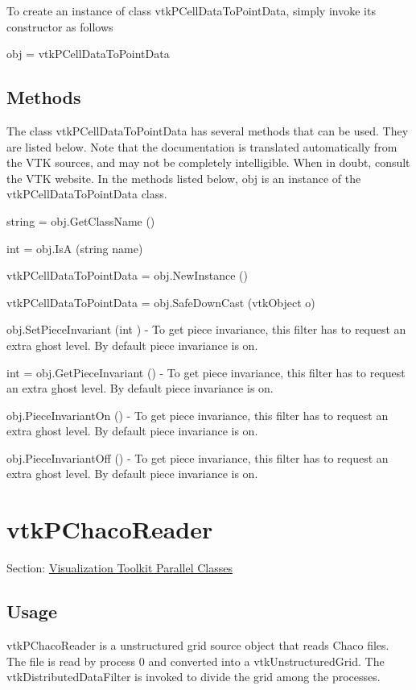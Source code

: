 To create an instance of class vtk\-P\-Cell\-Data\-To\-Point\-Data, simply invoke its constructor as follows \begin{DoxyVerb}  obj = vtkPCellDataToPointData
\end{DoxyVerb}
 \hypertarget{vtkwidgets_vtkxyplotwidget_Methods}{}\subsection{Methods}\label{vtkwidgets_vtkxyplotwidget_Methods}
The class vtk\-P\-Cell\-Data\-To\-Point\-Data has several methods that can be used. They are listed below. Note that the documentation is translated automatically from the V\-T\-K sources, and may not be completely intelligible. When in doubt, consult the V\-T\-K website. In the methods listed below, {\ttfamily obj} is an instance of the vtk\-P\-Cell\-Data\-To\-Point\-Data class. 
\begin{DoxyItemize}
\item {\ttfamily string = obj.\-Get\-Class\-Name ()}  
\item {\ttfamily int = obj.\-Is\-A (string name)}  
\item {\ttfamily vtk\-P\-Cell\-Data\-To\-Point\-Data = obj.\-New\-Instance ()}  
\item {\ttfamily vtk\-P\-Cell\-Data\-To\-Point\-Data = obj.\-Safe\-Down\-Cast (vtk\-Object o)}  
\item {\ttfamily obj.\-Set\-Piece\-Invariant (int )} -\/ To get piece invariance, this filter has to request an extra ghost level. By default piece invariance is on.  
\item {\ttfamily int = obj.\-Get\-Piece\-Invariant ()} -\/ To get piece invariance, this filter has to request an extra ghost level. By default piece invariance is on.  
\item {\ttfamily obj.\-Piece\-Invariant\-On ()} -\/ To get piece invariance, this filter has to request an extra ghost level. By default piece invariance is on.  
\item {\ttfamily obj.\-Piece\-Invariant\-Off ()} -\/ To get piece invariance, this filter has to request an extra ghost level. By default piece invariance is on.  
\end{DoxyItemize}\hypertarget{vtkparallel_vtkpchacoreader}{}\section{vtk\-P\-Chaco\-Reader}\label{vtkparallel_vtkpchacoreader}
Section\-: \hyperlink{sec_vtkparallel}{Visualization Toolkit Parallel Classes} \hypertarget{vtkwidgets_vtkxyplotwidget_Usage}{}\subsection{Usage}\label{vtkwidgets_vtkxyplotwidget_Usage}
vtk\-P\-Chaco\-Reader is a unstructured grid source object that reads Chaco files. The file is read by process 0 and converted into a vtk\-Unstructured\-Grid. The vtk\-Distributed\-Data\-Filter is invoked to divide the grid among the processes.

